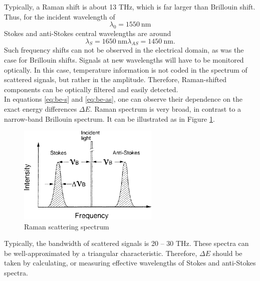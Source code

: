 \documentclass{standalone}
\begin{document}
Typically, a Raman shift is about 13 THz, which is far larger than Brillouin shift. Thus, for the incident wavelength of
\begin{equation}
\lambda_0 = \SI{1550}{\nano \meter}
\end{equation}
Stokes and anti-Stokes central wavelengths are around
\begin{subequations}
	\begin{equation}
	\lambda_S = \SI{1650}{\nano \meter}
	\end{equation}
	\begin{equation}
	\lambda_{AS} = \SI{1450}{\nano \meter} \textrm{.}
	\end{equation}
\end{subequations}
Such frequency shifts can not be observed in the electrical domain, as was the case for Brillouin shifts. Signals at new wavelengths will have to be monitored optically. In this case, temperature information is not coded in the spectrum of scattered signals, but rather in the amplitude. Therefore, Raman-shifted components can be optically filtered and easily detected. \\

In equations \ref{eq:be-s} and \ref{eq:be-as}, one can observe their dependence on the exact energy differences $\varDelta E$. Raman spectrum is very broad, in contrast to a narrow-band Brillouin spectrum. It can be illustrated as in Figure \ref{fig:raman_spectrum}.
\begin{figure}[h]
	\centering
	\includegraphics[width=0.6\textwidth]{raman_spectrum.png}
	\caption{Raman scattering spectrum \cite{fer:oks}}
	\label{fig:raman_spectrum}
\end{figure}
Typically, the bandwidth of scattered signals is 20 -- 30 THz. These spectra can be well-approximated by a triangular characteristic. Therefore, $\varDelta E$ should be taken by calculating, or measuring effective wavelengths of Stokes and anti-Stokes spectra. \\
\end{document}

